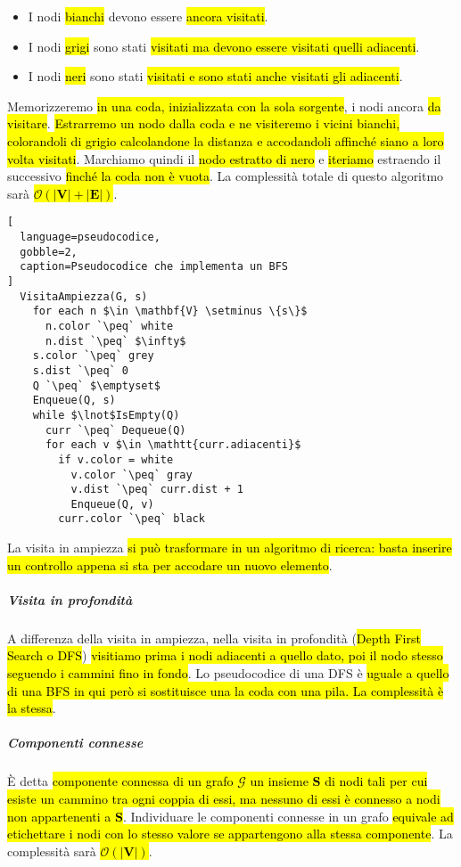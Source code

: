 \documentclass[a4paper,11pt,twoside]{article}
\theoremstyle{plain}
\theoremstyle{definition}
\theoremstyle{remark}
\newcommand{\peq}{$\gets$}
\begin{document}
\begin{itemize}
  \item I nodi \hl{bianchi} devono essere \hl{ancora visitati}.
  \item I nodi \hl{grigi} sono stati \hl{visitati ma devono essere visitati
    quelli adiacenti}.
  \item I nodi \hl{neri} sono stati \hl{visitati e sono stati anche visitati gli
    adiacenti}.
\end{itemize}

\noindent Memorizzeremo \hl{in una coda, inizializzata con la sola sorgente}, i
nodi ancora \hl{da visitare}. \hl{Estrarremo un nodo dalla coda e ne visiteremo
i vicini bianchi, colorandoli di grigio calcolandone la distanza e accodandoli
affinché siano a loro volta visitati}. Marchiamo quindi il \hl{nodo estratto di
nero} e \hl{iteriamo} estraendo il successivo \hl{finché la coda non è vuota}.
La complessità totale di questo algoritmo sarà \hl{$\mathcal{O}(|\mathbf{V}| +
|\mathbf{E}|)$}.

\begin{lstlisting}[
  language=pseudocodice,
  gobble=2,
  caption=Pseudocodice che implementa un BFS
]
  VisitaAmpiezza(G, s)
    for each n $\in \mathbf{V} \setminus \{s\}$
      n.color `\peq` white
      n.dist `\peq` $\infty$
    s.color `\peq` grey
    s.dist `\peq` 0
    Q `\peq` $\emptyset$
    Enqueue(Q, s)
    while $\lnot$IsEmpty(Q)
      curr `\peq` Dequeue(Q)
      for each v $\in \mathtt{curr.adiacenti}$
        if v.color = white
          v.color `\peq` gray
          v.dist `\peq` curr.dist + 1
          Enqueue(Q, v)
        curr.color `\peq` black
\end{lstlisting}

\noindent La visita in ampiezza \hl{si può trasformare in un algoritmo di
ricerca: basta inserire un controllo appena si sta per accodare un nuovo
elemento}.

\subparagraph{Visita in profondità} A differenza della visita in ampiezza, nella
visita in profondità (\hl{Depth First Search o DFS}) \hl{visitiamo prima i nodi
adiacenti a quello dato, poi il nodo stesso seguendo i cammini fino in fondo}.
Lo pseudocodice di una DFS è \hl{uguale a quello di una BFS in qui però si
sostituisce una la coda con una pila. La complessità è la stessa}.

\subparagraph{Componenti connesse} È detta \hl{componente connessa di un grafo
$\mathcal{G}$ un insieme $\mathbf{S}$ di nodi tali per cui esiste un cammino
tra ogni coppia di essi, ma nessuno di essi è connesso a nodi non appartenenti a
$\mathbf{S}$}. Individuare le componenti connesse in un grafo \hl{equivale ad
etichettare i nodi con lo stesso valore se appartengono alla stessa componente}.
La complessità sarà \hl{$\mathcal{O}(|\mathbf{V}|)$}.
\end{document}
